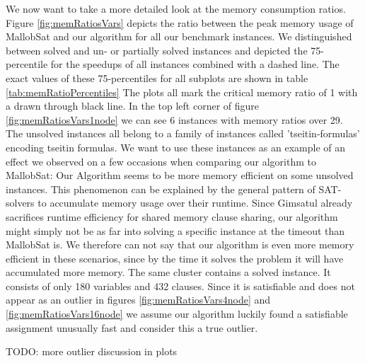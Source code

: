\documentclass[12pt,a4paper,twoside]{scrartcl}
\numberwithin{equation}{section}
\begin{document}
\label{sec:peakMemRatios}
We now want to take a more detailed look at the memory consumption ratios. Figure \ref{fig:memRatiosVars} depicts the ratio between the peak memory usage of MallobSat and our algorithm for all our benchmark instances. We distinguished between solved and un- or partially solved instances and depicted the 75-percentile for the speedups of all instances combined with a dashed line. The exact values of these 75-percentiles for all subplots are shown in table \ref{tab:memRatioPercentiles} The plots all mark the critical memory ratio of 1 with a drawn through black line.
In the top left corner of figure \ref{fig:memRatiosVars1node} we can see 6 instances with memory ratios over 29. The unsolved instances all belong to a family of instances called 'tseitin-formulas' encoding tseitin formulas. We want to use these instances as an example of an effect we observed on a few occasions when comparing our algorithm to MallobSat: Our Algorithm seems to be more memory efficient on some unsolved instances. This phenomenon can be explained by the general pattern of SAT-solvers to accumulate memory usage over their runtime. Since Gimsatul already sacrifices runtime efficiency for shared memory clause sharing, our algorithm might simply not be as far into solving a specific instance at the timeout than MallobSat is. We therefore can not say that our algorithm is even more memory efficient in these scenarios, since by the time it solves the problem it will have accumulated more memory.
The same cluster contains a solved instance. It consists of only 180 variables and 432 clauses. Since it is satisfiable and does not appear as an outlier in figures \ref{fig:memRatiosVars4node} and \ref{fig:memRatiosVars16node} we assume our algorithm luckily found a satisfiable assignment unusually fast and consider this a true outlier.

TODO: more outlier discussion in plots
\end{document}
